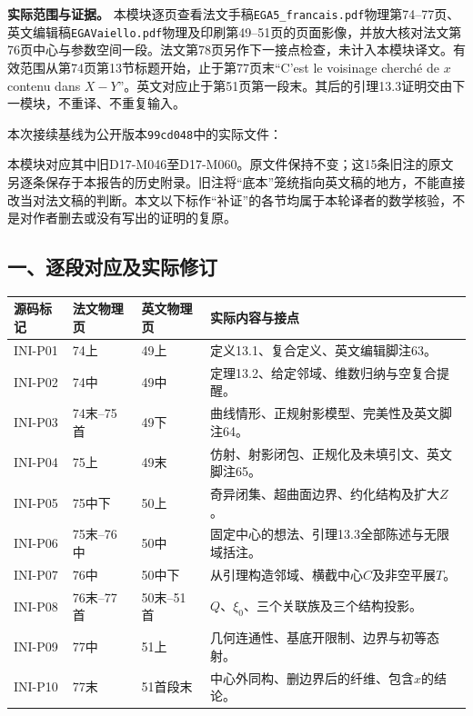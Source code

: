 
\noindent\textbf{实际范围与证据。}
本模块逐页查看法文手稿\texttt{EGA5\_francais.pdf}物理第74--77页、英文编辑稿\texttt{EGAVaiello.pdf}物理及印刷第49--51页的页面影像，并放大核对法文第76页中心与参数空间一段。法文第78页另作下一接点检查，未计入本模块译文。有效范围从第74页第13节标题开始，止于第77页末“C'est le voisinage cherch\'e de $x$ contenu dans $X-Y$”。英文对应止于第51页第一段末。其后的引理13.3证明交由下一模块，不重译、不重复输入。

本次接续基线为公开版本\texttt{99cd048}中的实际文件：
\par\noindent
{}
\par\smallskip
本模块对应其中旧D17-M046至D17-M060。原文件保持不变；这15条旧注的原文另逐条保存于本报告的历史附录。旧注将“底本”笼统指向英文稿的地方，不能直接改当对法文稿的判断。本文以下标作“补证”的各节均属于本轮译者的数学核验，不是对作者删去或没有写出的证明的复原。

\subsection*{一、逐段对应及实际修订}

\begin{longtable}{@{}p{.12\linewidth}p{.17\linewidth}p{.17\linewidth}p{.42\linewidth}@{}}
\toprule
源码标记 & 法文物理页 & 英文物理页 & 实际内容与接点\\
\midrule
\endhead
INI-P01 & 74上 & 49上 & 定义13.1、复合定义、英文编辑脚注63。\\
INI-P02 & 74中 & 49中 & 定理13.2、给定邻域、维数归纳与空复合提醒。\\
INI-P03 & 74末--75首 & 49下 & 曲线情形、正规射影模型、完美性及英文脚注64。\\
INI-P04 & 75上 & 49末 & 仿射、射影闭包、正规化及未填引文、英文脚注65。\\
INI-P05 & 75中下 & 50上 & 奇异闭集、超曲面边界、约化结构及扩大$Z$。\\
INI-P06 & 75末--76中 & 50中 & 固定中心的想法、引理13.3全部陈述与无限域括注。\\
INI-P07 & 76中 & 50中下 & 从引理构造邻域、横截中心$C$及非空平展$T$。\\
INI-P08 & 76末--77首 & 50末--51首 & $Q$、$\xi_0$、三个关联族及三个结构投影。\\
INI-P09 & 77中 & 51上 & 几何连通性、基底开限制、边界与初等态射。\\
INI-P10 & 77末 & 51首段末 & 中心外同构、删边界后的纤维、包含$x$的结论。\\
\bottomrule
\end{longtable}

